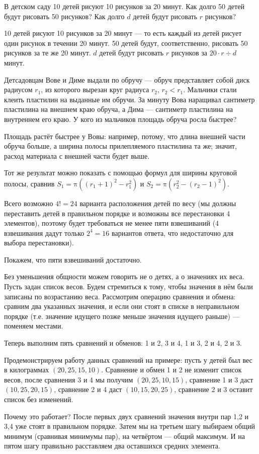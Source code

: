 \begin{itemize}
\itA В детском саду 10 детей рисуют 10 рисунков за 20 минут. Как долго 50 детей будут 
рисовать 50 рисунков? Как долго $d$ детей будут рисовать $r$ рисунков?

10 детей рисуют 10 рисунков за 20 минут --- то есть каждый из детей рисует один рисунок в течении 20 минут.
50 детей будут, соответственно, рисовать 50 рисунков за те же 20 минут.
$d$ детей будут рисовать $r$ рисунков за $20 \cdot r \div d$ минут.

\itB Детсадовцам Вове и Диме выдали по обручу — обруч представляет собой диск 
радиусом $r_1$, из которого вырезан круг радиуса $r_2$, $r_2<r_1$. Мальчики стали клеить 
пластилин на выданные им обручи. За минуту Вова наращивал сантиметр пластилина на внешнем краю 
обруча, а Дима — сантиметр пластилина на внутреннем его краю. У кого из мальчиков площадь обруча росла быстрее?

Площадь растёт быстрее у Вовы: например, потому, что длина внешней части обруча больше,
а ширина полосы прилепляемого пластилина та же; значит, расход материала с внешней части будет выше.

Тот же результат можно показать с помощью формул для ширины круговой полосы, сравнив
$S_1 = \text{π}((r_1+1)^2 - r_1^2)$ и $S_2 = \text{π}(r_2^2 - (r_2-1)^2)$.

\itC Всего возможно $4! = 24$ варианта расположения детей по весу (мы должны переставить 
детей в правильном порядке и возможны все перестановки 4 элементов), 
поэтому будет требоваться не менее пяти взвешиваний (4 взвешивания 
дадут только $2^4 = 16$ вариантов ответа, что недостаточно для выбора перестановки).

Покажем, что пяти взвешиваний достаточно. 

Без уменьшения общности можем говорить не о детях, а о значениях их веса.
Пусть задан список весов. Будем стремиться к тому, чтобы значения в нём были записаны по возрастанию веса.
Рассмотрим операцию сравнения и обмена: сравним два указанных значения, и если они стоят в списке
в неправильном порядке (т.е. значение идущего позже меньше значения идущего раньше) --- поменяем местами.

Теперь выполним пять сравнений и обменов: 1 и 2, 3 и 4, 1 и 3, 2 и 4, 2 и 3.

Продемонстрируем работу данных сравнений на примере: пусть у детей был вес в килограммах
$(20,25,15,10)$. Сравнение и обмен 1 и 2 не изменит список весов, после сравнения 3 и 4
мы получим $(20,25,10,15)$, сравнение 1 и 3 даст $(10,25,20,15)$, сравнение 2 и 4 даст
$(10,15,20,25)$, сравнение 2 и 3 оставит список без изменений.

Почему это работает? После первых двух сравнений значения внутри пар 1,2 и 3,4 уже стоят в правильном
порядке. Затем мы на третьем шагу выбираем общий минимум (сравнивая минимумы пар), 
на четвёртом --- общий максимум. И на пятом шагу
правильно расставляем два оставшихся средних элемента.

\end{itemize}
